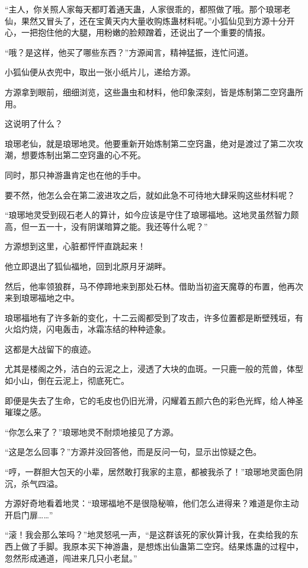 \begin{this_body}
“主人，你关照人家每天都盯着通天蛊，人家很乖的，都照做了哦。那个琅琊老仙，果然又冒头了，还在宝黄天内大量收购炼蛊材料呢。”小狐仙见到方源十分开心，一把抱住他的大腿，用粉嫩的脸颊蹭着，还说出了一个重要的情报。

“哦？是这样，他买了哪些东西？”方源闻言，精神猛振，连忙问道。

小狐仙便从衣兜中，取出一张小纸片儿，递给方源。

方源拿到眼前，细细浏览，这些蛊虫和材料，他印象深刻，皆是炼制第二空窍蛊所用。

这说明了什么？

琅琊老仙，就是琅琊地灵。他要重新开始炼制第二空窍蛊，绝对是渡过了第二次攻潮，想要炼制出第二空窍蛊的心不死。

同时，那只神游蛊肯定也在他的手中。

要不然，他怎么会在第二波进攻之后，就如此急不可待地大肆采购这些材料呢？

“琅琊地灵受到砚石老人的算计，如今应该是守住了琅琊福地。这地灵虽然智力颇高，但一五一十，没有阴谋暗算之能。我还等什么呢？”

方源想到这里，心脏都怦怦直跳起来！

他立即退出了狐仙福地，回到北原月牙湖畔。

然后，他率领狼群，马不停蹄地来到那处石林。借助当初盗天魔尊的布置，他再次来到琅琊福地之中。

琅琊福地有了许多新的变化，十二云阁都受到了攻击，许多位置都是断壁残垣，有火焰灼烧，闪电轰击，冰霜冻结的种种迹象。

这都是大战留下的痕迹。

尤其是楼阁之外，洁白的云泥之上，浸透了大块的血斑。一只鹿一般的荒兽，体型如小山，倒在云泥上，彻底死亡。

即便是失去了生命，它的毛皮也仍旧光滑，闪耀着五颜六色的彩色光辉，给人神圣璀璨之感。

“你怎么来了？”琅琊地灵不耐烦地接见了方源。

“这是怎么回事？”方源并没回答他，而是反问一句，显示出惊疑之色。

“哼，一群胆大包天的小辈，居然敢打我家的主意，都被我杀了！”琅琊地灵面色阴沉，杀气四溢。

方源好奇地看着地灵：“琅琊福地不是很隐秘嘛，他们怎么进得来？难道是你主动开启门扉……”

“滚！我会那么笨吗？”地灵怒吼一声，“是这群该死的家伙算计我，在卖给我的东西上做了手脚。我原本买下神游蛊，是想炼出仙蛊第二空窍。结果炼蛊的过程中，忽然形成通道，闯进来几只小老鼠。”


\end{this_body}
